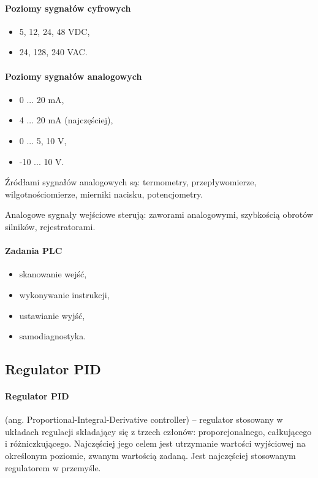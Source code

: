 \documentclass[]{report}
\begin{document}
\paragraph{Poziomy sygnałów cyfrowych}
\begin{itemize}
\item 5, 12, 24, 48 VDC,
\item 24, 128, 240 VAC.
\end{itemize}


\paragraph{Poziomy sygnałów analogowych}
\begin{itemize}
\item 0 ... 20 mA,
\item 4 ... 20 mA (najczęściej),
\item 0 ... 5, 10 V,
\item -10 ... 10 V.
\end{itemize}

Źródłami sygnałów analogowych są: termometry, przepływomierze, wilgotnościomierze, mierniki nacisku, potencjometry.

Analogowe sygnały wejściowe sterują: zaworami analogowymi, szybkością obrotów silników, rejestratorami.

\paragraph{Zadania PLC}
\begin{itemize}
\item skanowanie wejść,
\item wykonywanie instrukcji,
\item ustawianie wyjść,
\item samodiagnostyka.
\end{itemize}

\subsection{Regulator PID}

\paragraph{Regulator PID} (ang. Proportional-Integral-Derivative controller) – regulator stosowany w układach regulacji składający się z trzech członów: proporcjonalnego, całkującego i różniczkującego. Najczęściej jego celem jest utrzymanie wartości wyjściowej na określonym poziomie, zwanym wartością zadaną. Jest najczęściej stosowanym regulatorem w przemyśle.\\
\end{document}
